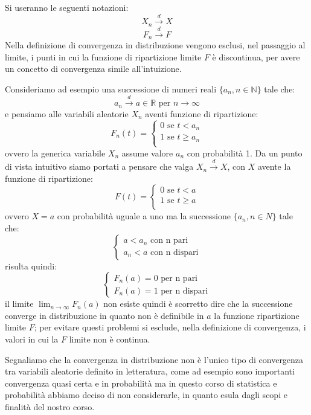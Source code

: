 \documentclass[a4paper,12pt, oneside]{book}
\newcommand{\numberset}{\mathbb}
\newcommand{\N}{\numberset{N}}
\newcommand{\R}{\numberset{R}}
\begin{document}
Si useranno le seguenti notazioni:
\[X_n\stackrel{d}{\longrightarrow} X\]
\[F_n\stackrel{d}{\longrightarrow} F\]
Nella definizione di convergenza in distribuzione vengono esclusi, nel passaggio al limite, i punti 
in cui la funzione di ripartizione limite $F$ è discontinua, per avere un concetto di convergenza simile all'intuizione.

Consideriamo ad esempio una successione di numeri reali $\{a_n, n \in \N\}$ tale che:
\[a_n \stackrel{d}{\longrightarrow} a \in \R \mbox{ per } n \to \infty\]
e pensiamo alle variabili aleatorie $X_n$ aventi funzione di ripartizione:
\[F_n(t) = \begin{cases}
            0 \mbox{ se } t < a_n\\
            1 \mbox{ se } t \geq a_n\\
           \end{cases}\]
ovvero la generica variabile $X_n$ assume valore $a_n$ con probabilità 1.\newline
Da un punto di vista intuitivo siamo portati a pensare che valga $X_n \stackrel{d}{\longrightarrow} X$,
con $X$ avente la funzione di ripartizione:
\[ F(t) = \begin{cases}
            0 \mbox{ se } t < a\\
            1 \mbox{ se } t \geq a\\
          \end{cases}\]
ovvero $X = a$ con probabilità uguale a uno ma la successione $\{a_n, n \in N\}$ tale che:
\[\begin{cases}
        a<a_n\mbox{ con n pari}\\
        a_n<a\mbox{ con n dispari}
  \end{cases}\]
risulta quindi:
\[\begin{cases}
    F_n(a) = 0 \mbox{ per n pari}\\
    F_n(a) = 1 \mbox{ per n dispari}
\end{cases}\]
il limite $\lim_{n \to \infty} F_n(a)$ non esiste quindi è scorretto dire che la successione converge
in distribuzione in quanto non è definibile in $a$ la funzione ripartizione limite $F$;
per evitare questi problemi si esclude, nella definizione di convergenza, i valori in cui la $F$ limite non è continua.

Segnaliamo che la convergenza in distribuzione non è l’unico tipo di convergenza tra variabili aleatorie
definito in letteratura, come ad esempio sono importanti convergenza quasi certa e in probabilità ma
in questo corso di statistica e probabilità abbiamo deciso di non considerarle, in quanto esula dagli scopi
e finalità del nostro corso.
\end{document}
